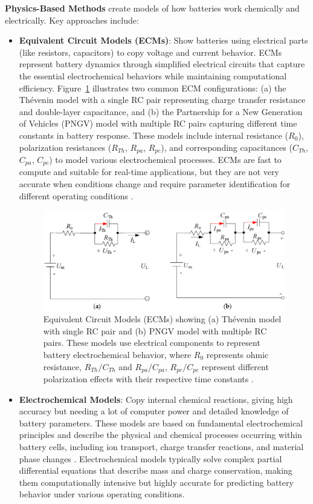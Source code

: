 \textbf{Physics-Based Methods} create models of how batteries work chemically and electrically. Key approaches include:
\begin{itemize}
    \item \textbf{Equivalent Circuit Models (ECMs)}: Show batteries using electrical parts (like resistors, capacitors) to copy voltage and current behavior. ECMs represent battery dynamics through simplified electrical circuits that capture the essential electrochemical behaviors while maintaining computational efficiency. Figure~\ref{fig:ecm_models} illustrates two common ECM configurations: (a) the Thévenin model with a single RC pair representing charge transfer resistance and double-layer capacitance, and (b) the Partnership for a New Generation of Vehicles (PNGV) model with multiple RC pairs capturing different time constants in battery response. These models include internal resistance ($R_0$), polarization resistances ($R_{Th}$, $R_{pa}$, $R_{pc}$), and corresponding capacitances ($C_{Th}$, $C_{pa}$, $C_{pc}$) to model various electrochemical processes. ECMs are fast to compute and suitable for real-time applications, but they are not very accurate when conditions change and require parameter identification for different operating conditions \cite{tran_comparative_2021}.

\begin{figure}[htbp]
\centering
\includegraphics[width=1.0\textwidth]{imgs/ECM_1st_2nd_order.png}
\caption{Equivalent Circuit Models (ECMs) showing (a) Thévenin model with single RC pair and (b) PNGV model with multiple RC pairs. These models use electrical components to represent battery electrochemical behavior, where $R_0$ represents ohmic resistance, $R_{Th}/C_{Th}$ and $R_{pa}/C_{pa}$, $R_{pc}/C_{pc}$ represent different polarization effects with their respective time constants \cite{tran_comparative_2021}.}
\label{fig:ecm_models}
\end{figure}

    \item \textbf{Electrochemical Models}: Copy internal chemical reactions, giving high accuracy but needing a lot of computer power and detailed knowledge of battery parameters. These models are based on fundamental electrochemical principles and describe the physical and chemical processes occurring within battery cells, including ion transport, charge transfer reactions, and material phase changes \cite{mama_comprehensive_2025}. Electrochemical models typically solve complex partial differential equations that describe mass and charge conservation, making them computationally intensive but highly accurate for predicting battery behavior under various operating conditions.


\end{itemize}
